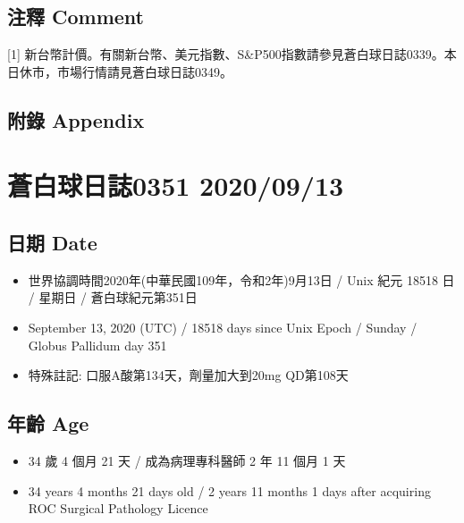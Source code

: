 \documentclass[a5paper, 11pt
]{book}
\providecommand{\tightlist}{%
  \setlength{\itemsep}{0pt}\setlength{\parskip}{0pt}}
\begin{document}
\hypertarget{ux6ce8ux91cb-comment-11}{%
\subsection{注釋 Comment}\label{ux6ce8ux91cb-comment-11}}

{[}1{]}
新台幣計價。有關新台幣、美元指數、S\&P500指數請參見蒼白球日誌0339。本日休市，市場行情請見蒼白球日誌0349。

\hypertarget{ux9644ux9304-appendix-11}{%
\subsection{附錄 Appendix}\label{ux9644ux9304-appendix-11}}

\hypertarget{ux84bcux767dux7403ux65e5ux8a8c0351-20200913}{%
\section{蒼白球日誌0351
2020/09/13}\label{ux84bcux767dux7403ux65e5ux8a8c0351-20200913}}

\hypertarget{ux65e5ux671f-date-12}{%
\subsection{日期 Date}\label{ux65e5ux671f-date-12}}

\begin{itemize}
\tightlist
\item
  世界協調時間2020年(中華民國109年，令和2年)9月13日 / Unix 紀元 18518 日
  / 星期日 / 蒼白球紀元第351日
\item
  September 13, 2020 (UTC) / 18518 days since Unix Epoch / Sunday /
  Globus Pallidum day 351
\item
  特殊註記: 口服A酸第134天，劑量加大到20mg QD第108天
\end{itemize}

\hypertarget{ux5e74ux9f61-age-12}{%
\subsection{年齡 Age}\label{ux5e74ux9f61-age-12}}

\begin{itemize}
\tightlist
\item
  34 歲 4 個月 21 天 / 成為病理專科醫師 2 年 11 個月 1 天
\item
  34 years 4 months 21 days old / 2 years 11 months 1 days after
  acquiring ROC Surgical Pathology Licence
\end{itemize}
\end{document}

